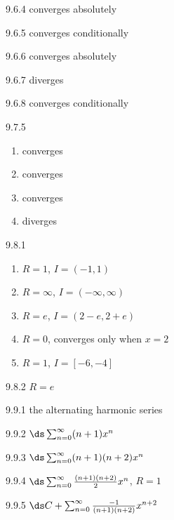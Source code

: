\begin{Answer}{9.6.4}
converges absolutely
\end{Answer}
\begin{Answer}{9.6.5}
converges conditionally
\end{Answer}
\begin{Answer}{9.6.6}
converges absolutely
\end{Answer}
\begin{Answer}{9.6.7}
diverges
\end{Answer}
\begin{Answer}{9.6.8}
converges conditionally
\end{Answer}
\begin{Answer}{9.7.5}
\begin{enumerate}
	\item converges
	\item converges
	\item converges
	\item diverges
\end{enumerate}
\end{Answer}
\begin{Answer}{9.8.1}
\begin{enumerate}
	\item $R=1$, $I=(-1,1)$
	\item $R=\infty$, $I=(-\infty,\infty)$
	\item $R=e$, $I=(2-e,2+e)$
	\item $R=0$, converges only when $x=2$
	\item $R=1$, $I=[-6,-4]$
\end{enumerate}
\end{Answer}
\begin{Answer}{9.8.2}
$R=e$
\end{Answer}
\begin{Answer}{9.9.1}
the alternating harmonic series
\end{Answer}
\begin{Answer}{9.9.2}
$\ds\sum_{n=0}^\infty (n+1)x^n$
\end{Answer}
\begin{Answer}{9.9.3}
$\ds\sum_{n=0}^\infty (n+1)(n+2)x^n$
\end{Answer}
\begin{Answer}{9.9.4}
$\ds\sum_{n=0}^\infty {(n+1)(n+2)\over 2}x^n$, $R=1$
\end{Answer}
\begin{Answer}{9.9.5}
$\ds C+\sum_{n=0}^\infty {-1\over (n+1)(n+2)}x^{n+2}$
\end{Answer}
